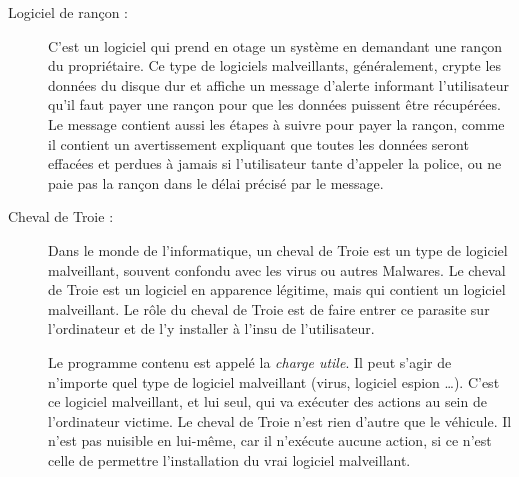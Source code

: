 \begin{description}
        \item[Logiciel de rançon :] C’est un logiciel qui prend en otage un système en demandant une rançon 
            du propriétaire. Ce type de logiciels malveillants, généralement, crypte les données du 
            disque dur et affiche un message d’alerte informant l’utilisateur qu’il faut payer une 
            rançon pour que les données puissent être récupérées. Le message contient aussi les étapes à suivre 
            pour payer la rançon, comme il contient un avertissement expliquant que toutes les données 
            seront effacées et perdues à jamais si l’utilisateur tante d'appeler la police, ou ne paie pas la rançon 
            dans le délai précisé par le message. %

        \item[Cheval de Troie :] Dans le monde de l'informatique, un cheval de Troie est un type de logiciel
            malveillant, souvent confondu avec les virus ou autres Malwares. Le cheval de Troie est un logiciel
            en apparence légitime, mais qui contient un logiciel malveillant. Le rôle du cheval de Troie est de faire
            entrer ce parasite sur l'ordinateur et de l'y installer à l'insu de l'utilisateur.

            Le programme contenu est appelé la \emph{charge utile}. Il peut s'agir de n'importe quel type
            de logiciel malveillant (virus, logiciel espion \ldots). C'est ce logiciel malveillant, et lui
            seul, qui va exécuter des actions au sein de l'ordinateur victime. Le cheval de Troie n'est rien
            d'autre que le véhicule. Il n'est pas nuisible en lui-même, car il n'exécute aucune action,
            si ce n'est celle de permettre l'installation du vrai logiciel malveillant. 
            \cite{wikipedia_trojan} %


\end{description}
